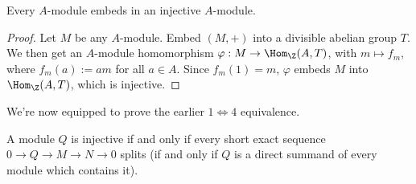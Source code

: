 \begin{thm}
    Every $A$-module embeds in an injective $A$-module.
\end{thm}

\begin{proof}
    Let $M$ be any $A$-module. Embed $(M,+)$ into a divisible abelian group $T$. We then get an $A$-module homomorphism $\varphi:M \to \Hom_\Z(A,T)$, with $m \mapsto f_m$, where $f_m(a) := am$ for all $a \in A$. Since $f_m(1)=m$, $\varphi$ embeds $M$ into $\Hom_\Z(A,T)$, which is injective.
\end{proof}

We're now equipped to prove the earlier $1 \iff 4$ equivalence.

\begin{prop}
    A module $Q$ is injective if and only if every short exact sequence $0 \to Q \to M \to N \to 0$ splits (if and only if $Q$ is a direct summand of every module which contains it).
\end{prop}


